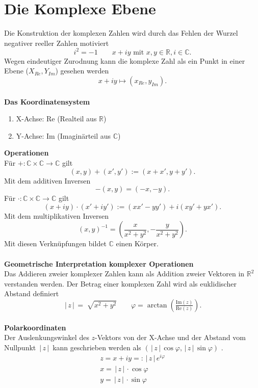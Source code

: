 \documentclass[a4paper,12pt]{article}
\begin{document}
\section{Die Komplexe Ebene}
Die Konstruktion der komplexen Zahlen wird durch das Fehlen der Wurzel negativer reeller Zahlen motiviert
\[ 
i^{2}=-1\qquad x+iy\text{ mit }x,y \in \mathbb{R},i \in \mathbb{C}
.\] 
Wegen eindeutiger Zurodnung kann die komplexe Zahl als ein Punkt in einer Ebene ($X_{Re},Y_{Im}$) gesehen werden
\[ 
x+iy\mapsto\left(x_{Re},y_{Im}\right)
.\] 
\hfill\\\textbf{Das Koordinatensystem}
\begin{enumerate}[label=]
        \item X-Achse: Re (Realteil aus $\mathbb{R}$)
        \item Y-Achse: Im (Imaginärteil aus $\mathbb{C}$)
\end{enumerate}
\textbf{Operationen}\\
Für $+:\mathbb{C}\times \mathbb{C}\rightarrow \mathbb{C}$ gilt
\[ 
        \left(x,y\right)+\left(x',y'\right):=\left(x+x',y+y'\right)
.\] 
Mit dem additiven Inversen
\[ 
        -\left(x,y\right)=\left(-x,-y\right)
.\] 
Für $\cdot :\mathbb{C}\times \mathbb{C}\rightarrow \mathbb{C}$ gilt
\[ 
        \left(x+iy\right)\cdot \left(x'+iy'\right):=\left(xx'-yy'\right)+i\left(xy'+yx'\right)
.\] 
Mit dem multiplikativen Inversen
\[ 
        \left(x,y\right)^{-1}=\left(\dfrac{x}{x^2+y^2},-\dfrac{y}{x^2+y^2}\right)
.\] 
Mit diesen Verknüpfungen bildet $\mathbb{C}$ einen Körper.
\\\hfill\\\textbf{Geometrische Interpretation komplexer Operationen}\\
Das Addieren zweier komplexer Zahlen kann als Addition zweier Vektoren in $\mathbb{R}^2$ verstanden werden. Der Betrag einer komplexen Zahl wird als euklidischer Abstand definiert
\[
        \,|\, z\,|\, =\sqrt[]{x^2+y^2}\qquad \varphi =\arctan\left(\tfrac{\text{Im}\left(z\right)}{\text{Re}\left(z\right)}\right)
.\]
\hfill\\\textbf{Polarkoordinaten}\\
Der Auslenkungswinkel des $z$-Vektors von der X-Achse und der Abstand vom Nullpunkt $\,|\, z\,|\, $ kann geschrieben werden als $\left(\,|\, z\,|\, \cos \varphi ,\,|\, z\,|\, \sin \varphi\right)$ .
\begin{gather*}
        z=x+iy=:\,|\, z\,|\, e^{i\varphi }\\
        x=\,|\, z\,|\, \cdot \cos \varphi \\
        y=\,|\, z\,|\, \cdot \sin \varphi
\end{gather*}
\end{document}
